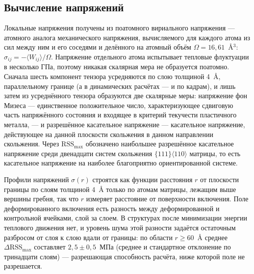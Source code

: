 \subsection{Вычисление напряжений}

Локальные напряжения получены из поатомного вириального напряжения ---
атомного аналога механического напряжения, вычисляемого для каждого атома из
сил между ним и его соседями и делённого на атомный объём
$\Omega = 16{,}61$~\AA{}$^3$: $\sigma_{ij} = -\langle W_{ij}\rangle/\Omega$.
Напряжение отдельного атома испытывает тепловые флуктуации в несколько ГПа,
поэтому никакая скалярная мера не образуется поатомно. Сначала шесть
компонент тензора усредняются по слою толщиной 4~\AA{}, параллельному границе
(а в динамических расчётах --- и по кадрам), и лишь затем из усреднённого
тензора образуются две скалярные меры: напряжение фон Мизеса --- единственное положительное число,
характеризующее сдвиговую часть напряжённого состояния и входящее в критерий
текучести пластичного металла, --- и разрешённое
касательное напряжение --- касательное напряжение, действующее на данной
плоскости скольжения в данном направлении скольжения. Через
$\mathrm{RSS}_{\max}$ обозначено наибольшее разрешённое касательное
напряжение среди двенадцати систем скольжения $\{111\}\langle110\rangle$
матрицы, то есть касательное напряжение на наиболее благоприятно
ориентированной системе.

Профили напряжений $\sigma(r)$ строятся как функции расстояния $r$ от
плоскости границы по слоям толщиной 4~\AA{} только по атомам матрицы,
лежащим выше вершины гребня, так что $r$ измеряет расстояние от поверхности
включения. Поле деформированного включения есть разность между
деформированной и контрольной ячейками, слой за слоем. В структурах после
минимизации энергии теплового движения нет, и уровень шума этой разности
задаётся остаточным разбросом от слоя к слою вдали от границы: по области
$r \geq 60$~\AA{} среднее $\Delta\mathrm{RSS}_{\max}$ составляет
$2{,}5 \pm 0{,}5$~МПа (среднее и стандартное отклонение по тринадцати
слоям) --- разрешающая способность расчёта, ниже которой поле не
разрешается.